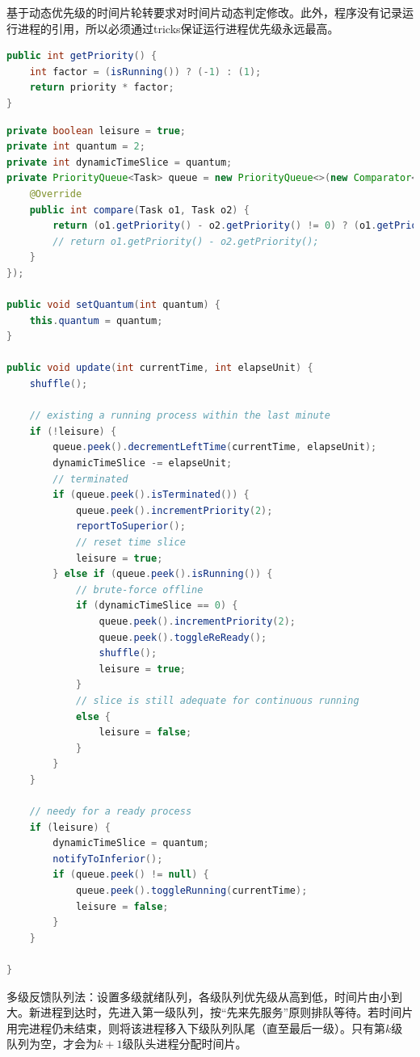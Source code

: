 \documentclass[12pt, a4paper, UTF8]{ctexart}
\begin{document}
基于动态优先级的时间片轮转要求对时间片动态判定修改。此外，程序没有记录运行进程的引用，所以必须通过tricks保证运行进程优先级永远最高。

\begin{lstlisting}[language={java},caption={Getter（以优先级为例）}]
public int getPriority() {
    int factor = (isRunning()) ? (-1) : (1);
    return priority * factor;
}
\end{lstlisting}

\begin{lstlisting}[language={java},caption={基于动态优先级的时间片轮转}]
private boolean leisure = true;
private int quantum = 2;
private int dynamicTimeSlice = quantum;
private PriorityQueue<Task> queue = new PriorityQueue<>(new Comparator<Task>() {
    @Override
    public int compare(Task o1, Task o2) {
        return (o1.getPriority() - o2.getPriority() != 0) ? (o1.getPriority() - o2.getPriority()) : (o1.getJobSubmitTime() - o2.getJobSubmitTime());
        // return o1.getPriority() - o2.getPriority();
    }
});

public void setQuantum(int quantum) {
    this.quantum = quantum;
}

public void update(int currentTime, int elapseUnit) {
    shuffle();

    // existing a running process within the last minute
    if (!leisure) {
        queue.peek().decrementLeftTime(currentTime, elapseUnit);
        dynamicTimeSlice -= elapseUnit;
        // terminated
        if (queue.peek().isTerminated()) {
            queue.peek().incrementPriority(2);
            reportToSuperior();
            // reset time slice
            leisure = true;
        } else if (queue.peek().isRunning()) {
            // brute-force offline
            if (dynamicTimeSlice == 0) {
                queue.peek().incrementPriority(2);
                queue.peek().toggleReReady();
                shuffle();
                leisure = true;
            }
            // slice is still adequate for continuous running
            else {
                leisure = false;
            }
        }
    }

    // needy for a ready process
    if (leisure) {
        dynamicTimeSlice = quantum;
        notifyToInferior();
        if (queue.peek() != null) {
            queue.peek().toggleRunning(currentTime);
            leisure = false;
        }
    }

}
\end{lstlisting}

多级反馈队列法：设置多级就绪队列，各级队列优先级从高到低，时间片由小到大。新进程到达时，先进入第一级队列，按“先来先服务”原则排队等待。若时间片用完进程仍未结束，则将该进程移入下级队列队尾（直至最后一级）。只有第$k$级队列为空，才会为$k+1$级队头进程分配时间片。
\end{document}
